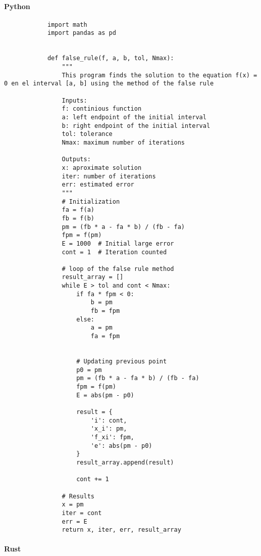 \documentclass{article}
\begin{document}
        \paragraph{Python}
        \begin{verbatim}
            import math
            import pandas as pd


            def false_rule(f, a, b, tol, Nmax):
                """
                This program finds the solution to the equation f(x) = 0 en el interval [a, b] using the method of the false rule

                Inputs:
                f: continious function
                a: left endpoint of the initial interval
                b: right endpoint of the initial interval
                tol: tolerance
                Nmax: maximum number of iterations

                Outputs:
                x: aproximate solution
                iter: number of iterations
                err: estimated error
                """
                # Initialization
                fa = f(a)
                fb = f(b)
                pm = (fb * a - fa * b) / (fb - fa)
                fpm = f(pm)
                E = 1000  # Initial large error
                cont = 1  # Iteration counted

                # loop of the false rule method
                result_array = []
                while E > tol and cont < Nmax:
                    if fa * fpm < 0:
                        b = pm
                        fb = fpm
                    else:
                        a = pm
                        fa = fpm


                    # Updating previous point
                    p0 = pm
                    pm = (fb * a - fa * b) / (fb - fa)
                    fpm = f(pm)
                    E = abs(pm - p0)

                    result = {
                        'i': cont,
                        'x_i': pm,
                        'f_xi': fpm,
                        'e': abs(pm - p0)
                    }
                    result_array.append(result)

                    cont += 1

                # Results
                x = pm
                iter = cont
                err = E
                return x, iter, err, result_array
        \end{verbatim}

    \paragraph{Rust}
\end{document}
